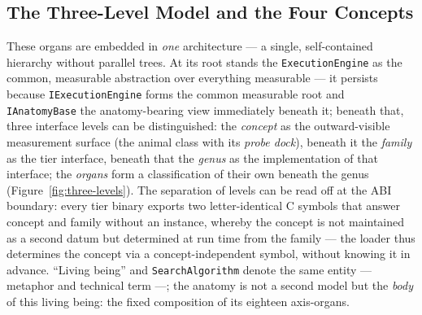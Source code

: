 \begin{nurlang}
\subsection{The Three-Level Model and the Four Concepts}\label{sec:anatomy-levels}
These organs are embedded in \emph{one} architecture --- a single, self-contained hierarchy
without parallel trees. At its root stands the \texttt{ExecutionEngine} as the common, measurable
abstraction over everything measurable --- it persists because \texttt{IExecutionEngine} forms the
common measurable root and \texttt{IAnatomyBase} the anatomy-bearing view immediately beneath it;
beneath that, three interface levels can be distinguished: the \emph{concept} as the outward-visible
measurement surface (the animal class with its \emph{probe dock}), beneath it the \emph{family} as the
tier interface, beneath that the \emph{genus} as the implementation of that interface; the \emph{organs}
form a classification of their own beneath the genus (Figure~\ref{fig:three-levels})\@. The
separation of levels can be read off at the ABI boundary: every tier binary exports two letter-identical
C symbols that answer concept and family without an instance, whereby the concept is not maintained as a second datum
but determined at run time from the family --- the loader thus determines the concept via a
concept-independent symbol, without knowing it in advance\@. \enquote{Living being} and \texttt{SearchAlgorithm} denote the same
entity --- metaphor and technical term ---; the anatomy is not a second model but the
\emph{body} of this living being: the fixed composition of its eighteen axis-organs.
\begin{figure}[htbp]\centering
{}
\end{figure}
\end{nurlang}
